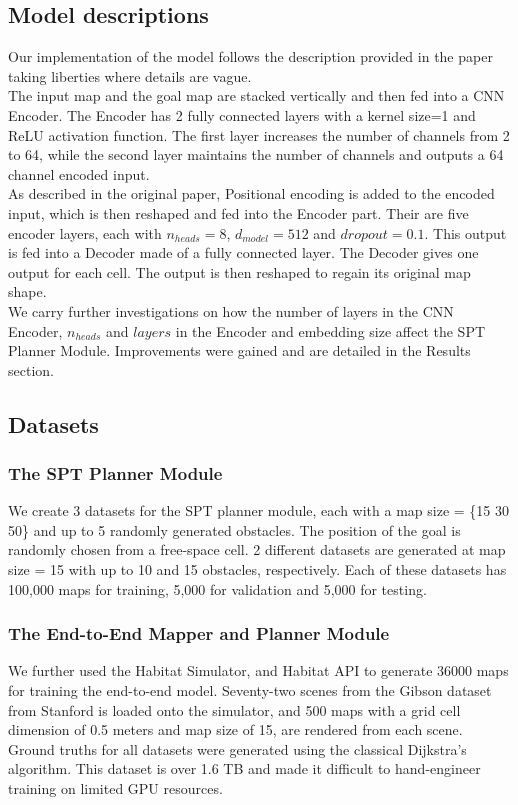 \subsection{Model descriptions}
Our implementation of the model follows the description provided in the paper taking liberties where details are vague. \\ 
The input map and the goal map are stacked vertically and then fed into a CNN Encoder. The Encoder has 2 fully connected layers with a kernel size=1 and ReLU activation function. The first layer increases the number of channels from 2 to 64, while the second layer maintains the number of channels and outputs a 64 channel encoded input.\\  
As described in the original paper, Positional encoding is added to the encoded input, which is then reshaped and fed into the Encoder part. Their are five encoder layers, each with $n_{heads}=8$, $d_{model}=512$ and $dropout=0.1$. This output is fed into a Decoder made of a fully connected layer. The Decoder gives one output for each cell. The output is then reshaped to regain its original map shape.\\  
We carry further investigations on how the number of layers in the CNN Encoder, $n_{heads}$ and $layers$ in the Encoder and embedding size affect the SPT Planner Module. Improvements were gained and are detailed in the Results section.


\subsection{Datasets}
\subsubsection{The SPT Planner Module}
We create 3 datasets for the SPT planner module, each with a map size = \{15  30  50\} and up to 5 randomly generated obstacles. The position of the goal is randomly chosen from a free-space cell. 2 different datasets are generated at map size = 15 with up to 10 and 15 obstacles, respectively. Each of these datasets has 100,000 maps for training, 5,000 for validation and 5,000 for testing. 

\subsubsection{The End-to-End Mapper and Planner Module}
We further used the Habitat Simulator, and Habitat API \cite{savva2019habitat} to generate 36000 maps for training the end-to-end model. Seventy-two scenes from the Gibson dataset \cite{xia2018gibson} from Stanford is loaded onto the simulator, and 500 maps with a grid cell dimension of 0.5 meters and map size of 15, are rendered from each scene. Ground truths for all datasets were generated using the classical Dijkstra's algorithm. This dataset is over 1.6 TB and made it difficult to hand-engineer training on limited GPU resources. 

